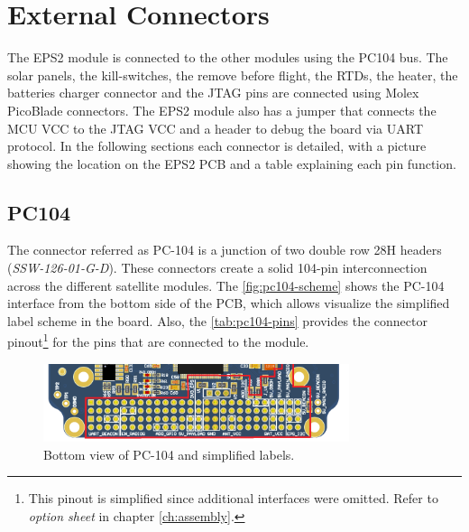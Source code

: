 \section{External Connectors} \label{external-connectors}

The EPS2 module is connected to the other modules using the PC104 bus. The solar panels, the kill-switches, the remove before flight, the RTDs, the heater, the batteries charger connector and the JTAG pins are connected using Molex PicoBlade connectors. The EPS2 module also has a jumper that connects the MCU VCC to the JTAG VCC and a header to debug the board via UART protocol. In the following sections each connector is detailed, with a picture showing the location on the EPS2 PCB and a table explaining each pin function.

\subsection{PC104} \label{PC104}

The connector referred as PC-104 is a junction of two double row 28H headers (\textit{SSW-126-01-G-D}). These connectors create a solid 104-pin interconnection across the different satellite modules. The \autoref{fig:pc104-scheme} shows the PC-104 interface from the bottom side of the PCB, which allows visualize the simplified label scheme in the board. Also, the \autoref{tab:pc104-pins} provides the connector pinout\footnote{This pinout is simplified since additional interfaces were omitted. Refer to \textit{option sheet} in chapter \ref{ch:assembly}.} for the pins that are connected to the module. 

\begin{figure}[!ht]
    \begin{center}
        \includegraphics[width=0.8\textwidth]{figures/eps2_pc104_scheme.png}
        \caption{Bottom view of PC-104 and simplified labels.}
        \label{fig:pc104-scheme}
    \end{center}
\end{figure}


